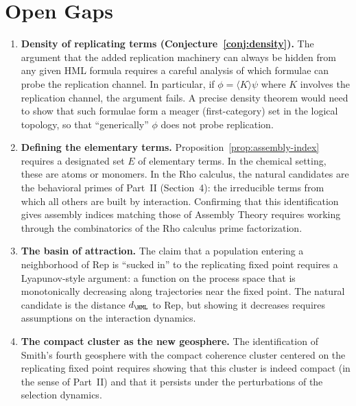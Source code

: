 \chapter{Open Gaps}
\label{sec:origins-gaps}

\begin{enumerate}[label=\textbf{Gap \arabic*.}, leftmargin=*, itemsep=8pt]

  \item \textbf{Density of replicating terms
        (Conjecture~\ref{conj:density}).}
        The argument that the added replication machinery can always
        be hidden from any given HML formula requires a careful
        analysis of which formulae can probe the replication channel.
        In particular, if $\phi = \langle K \rangle \psi$ where $K$
        involves the replication channel, the argument fails.
        A precise density theorem would need to show that such
        formulae form a meager (first-category) set in the logical
        topology, so that ``generically'' $\phi$ does not probe
        replication.

  \item \textbf{Defining the elementary terms.}
        Proposition~\ref{prop:assembly-index} requires a designated
        set $E$ of elementary terms.
        In the chemical setting, these are atoms or monomers.
        In the Rho calculus, the natural candidates are the
        behavioral primes of Part~II (Section~4): the irreducible
        terms from which all others are built by interaction.
        Confirming that this identification gives assembly indices
        matching those of Assembly Theory requires working through
        the combinatorics of the Rho calculus prime factorization.

  \item \textbf{The basin of attraction.}
        The claim that a population entering a neighborhood of
        $\mathrm{Rep}$ is ``sucked in'' to the replicating fixed
        point requires a Lyapunov-style argument: a function on the
        process space that is monotonically decreasing along
        trajectories near the fixed point.
        The natural candidate is the distance $d_{\HML}$ to
        $\mathrm{Rep}$, but showing it decreases requires
        assumptions on the interaction dynamics.

  \item \textbf{The compact cluster as the new geosphere.}
        The identification of Smith's fourth geosphere with the
        compact coherence cluster centered on the replicating fixed
        point requires showing that this cluster is indeed compact
        (in the sense of Part~II) and that it persists under the
        perturbations of the selection dynamics.


\end{enumerate}

